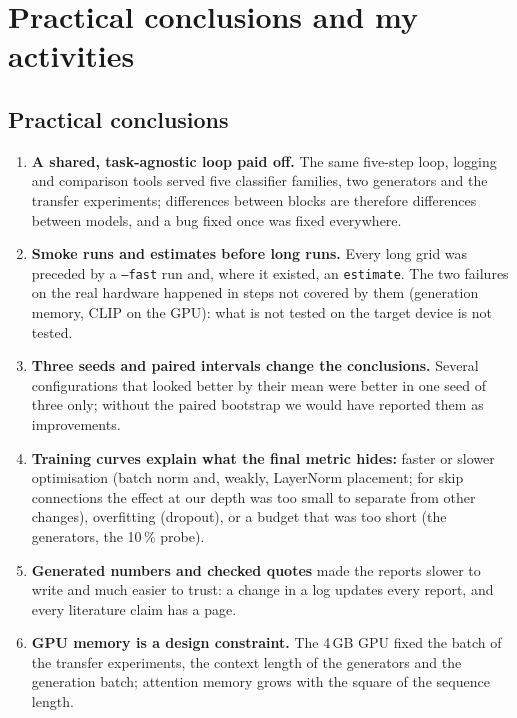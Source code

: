 \section{Practical conclusions and my activities}\label{sec:conclusions}

\subsection{Practical conclusions}

\begin{enumerate}[leftmargin=1.4em,itemsep=1pt]
  \item \textbf{A shared, task-agnostic loop paid off.} The same five-step loop, logging and comparison
        tools served five classifier families, two generators and the transfer experiments; differences
        between blocks are therefore differences between models, and a bug fixed once was fixed
        everywhere.
  \item \textbf{Smoke runs and estimates before long runs.} Every long grid was preceded by a
        \texttt{--fast} run and, where it existed, an \texttt{estimate}. The two failures on the real
        hardware happened in steps not covered by them (generation memory, CLIP on the GPU): what is not
        tested on the target device is not tested.
  \item \textbf{Three seeds and paired intervals change the conclusions.} Several configurations that
        looked better by their mean were better in one seed of three only; without the paired bootstrap
        we would have reported them as improvements.
  \item \textbf{Training curves explain what the final metric hides:} faster or slower optimisation
        (batch norm and, weakly, LayerNorm placement; for skip connections the effect at our depth was too
        small to separate from other changes), overfitting (dropout), or a budget that was
        too short (the generators, the 10\,\% probe).
  \item \textbf{Generated numbers and checked quotes} made the reports slower to write and much easier to
        trust: a change in a log updates every report, and every literature claim has a page.
  \item \textbf{GPU memory is a design constraint.} The 4\,GB GPU fixed the batch of the transfer
        experiments, the context length of the generators and the generation batch; attention memory
        grows with the square of the sequence length.
\end{enumerate}

